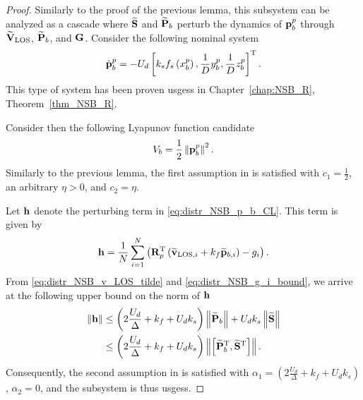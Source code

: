 \begin{proof}
    Similarly to the proof of the previous lemma, this subsystem can be analyzed as a cascade where ${\widetilde{\mathbf{S}}}$ and ${\widetilde{\mathbf{P}}}_{b}$ perturb the dynamics of $\mathbf{p}_b^p$ through $\widetilde{\mathbf{V}}_{\rm LOS}$, ${\widetilde{\mathbf{P}}}_{b}$, and $\mathbf{G}$.
    Consider the following nominal system
    \begin{equation}
        \dot{\mathbf{p}}_b^p = - U_d \left[k_s f_s\left(x_b^p\right), \frac{1}{D} y_b^p, \frac{1}{D} z_b^p\right]^{\mathrm{T}}.
        \label{eq:distr_NSB_p_b_nominal}
    \end{equation}
    This type of system has been proven \glspl{usges} in Chapter~\ref{chap:NSB_R}, Theorem~\ref{thm_NSB_R}.

    Consider then the following Lyapunov function candidate
    \begin{equation}
        V_b = \frac{1}{2} \left\|\mathbf{p}_b^p\right\|^2.
    \end{equation}
    Similarly to the previous lemma, the first assumption in \cite[Proposition 9]{pettersen_lyapunov_2017} is satisfied with $c_1 = \frac{1}{2}$, an arbitrary $\eta > 0$, and $c_2 = \eta$.
    
    Let $\mathbf{h}$ denote the perturbing term in \eqref{eq:distr_NSB_p_b_CL}. This term is given by
    \begin{equation}
        \mathbf{h} = \frac{1}{N} \sum_{i=1}^N \left(\mathbf{R}_p^{\mathrm{T}} \left(\widetilde{\mathbf{v}}_{{\rm LOS}, i} + k_f \widetilde{\mathbf{p}}_{b, i}\right) - g_i \right).
    \end{equation}
    From \eqref{eq:distr_NSB_v_LOS_tilde} and \eqref{eq:distr_NSB_g_i_bound}, we arrive at the following upper bound on the norm of $\mathbf{h}$
    \begin{align}
        \left\|\mathbf{h}\right\| &\leq \left(2\frac{U_d}{\Delta} + k_f + U_d k_s\right) \left\|\widetilde{\mathbf{P}}_b\right\| + U_d k_s \left\|\widetilde{\mathbf{S}}\right\| \nonumber \\
        &\leq \left(2\frac{U_d}{\Delta} + k_f + U_d k_s\right) \left\|\left[\widetilde{\mathbf{P}}_b^{\mathrm{T}}, \widetilde{\mathbf{S}}^{\mathrm{T}}\right]\right\|.
    \end{align}
    Consequently, the second assumption in \cite[Proposition 9]{pettersen_lyapunov_2017} is satisfied with $\alpha_1 = \left(2\frac{U_d}{\Delta} + k_f + U_d k_s\right)$, $\alpha_2 = 0$, and the subsystem is thus \glspl{usges}.
\end{proof}


